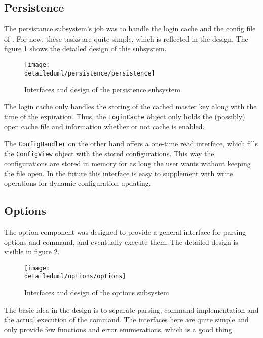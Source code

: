 \subsection{Persistence}

The persistance subsystem's job was to handle the login cache and the config
file of \pman. For now, these tasks are quite simple, which is reflected in the
design. The figure \ref{dia:persistence} shows the detailed design of this
subsystem.

\begin{figure}[H]
    \centering
    \centerline{\texttt{[image: \\detaileduml/persistence/persistence]}}
    \caption{Interfaces and design of the persistence subsystem.}
    \label{dia:persistence}
\end{figure}

The login cache only handles the storing of the cached master key along with the
time of the expiration. Thus, the \texttt{LoginCache} object only holds the
(possibly) open cache file and information whether or not cache is enabled.

The \texttt{ConfigHandler} on the other hand offers a one-time read interface,
which fills the \texttt{ConfigView} object with the stored configurations. This
way the configurations are stored in memory for as long the user wants without
keeping the file open. In the future this interface is easy to supplement with
write operations for dynamic configuration updating.

\subsection{Options}

The option component was designed to provide a general interface for parsing
options and command, and eventually execute them. The detailed design is visible
in figure \ref{dia:options_design}.

\begin{figure}[H]
    \centering
    \centerline{\texttt{[image: \\detaileduml/options/options]}}
    \caption{Interfaces and design of the options subsystem}
    \label{dia:options_design}
\end{figure}

The basic idea in the design is to separate parsing, command implementation
and the actual execution of the command. The interfaces here are quite simple
and only provide few functions and error enumerations, which is a good thing.


